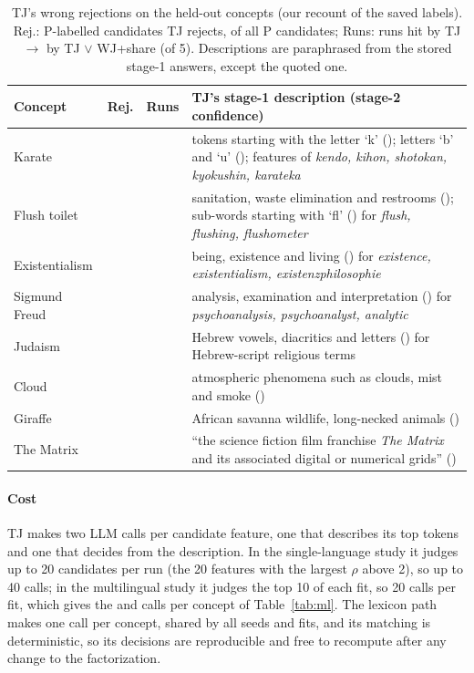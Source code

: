 \begin{table}[ht]
\centering
\footnotesize
\setlength{\tabcolsep}{3pt}
\begin{tabular}{@{}P{1.3cm}ccP{3.7cm}@{}}
\toprule
Concept & Rej. & Runs & TJ's stage-1 description (stage-2 confidence) \\
\midrule
Karate &  &  & tokens starting with the letter `k' (); letters `b' and `u' (); features of \emph{kendo, kihon, shotokan, kyokushin, karateka} \\
\addlinespace
Flush toilet &  &  & sanitation, waste elimination and restrooms (); sub-words starting with `fl' () for \emph{flush, flushing, flushometer} \\
\addlinespace
Existen\-tialism &  &  & being, existence and living () for \emph{existence, existentialism, existenzphilosophie} \\
\addlinespace
Sigmund Freud &  &  & analysis, examination and interpretation () for \emph{psychoanalysis, psychoanalyst, analytic} \\
\addlinespace
Judaism &  &  & Hebrew vowels, diacritics and letters () for Hebrew-script religious terms \\
\addlinespace
Cloud &  &  & atmospheric phenomena such as clouds, mist and smoke () \\
Giraffe &  &  & African savanna wildlife, long-necked animals () \\
The Matrix &  &  & ``the science fiction film franchise \emph{The Matrix} and its associated digital or numerical grids'' () \\
\bottomrule
\end{tabular}
\caption{TJ's wrong rejections on the held-out concepts (our recount of the saved labels). Rej.: P-labelled candidates TJ rejects, of all P candidates; Runs: runs hit by TJ $\to$ by TJ $\vee$ WJ+share (of 5). Descriptions are paraphrased from the stored stage-1 answers, except the quoted one.}
\label{tab:tj-rejections}
\end{table}

\paragraph{Cost}
TJ makes two LLM calls per candidate feature, one that describes its top tokens and one that decides from the description.
In the single-language study it judges up to 20 candidates per run (the 20 features with the largest $\rho$ above 2), so up to 40 calls; in the multilingual study it judges the top 10 of each fit, so 20 calls per fit, which gives the  and  calls per concept of Table~\ref{tab:ml}.
The lexicon path makes one call per concept, shared by all seeds and fits, and its matching is deterministic, so its decisions are reproducible and free to recompute after any change to the factorization.
